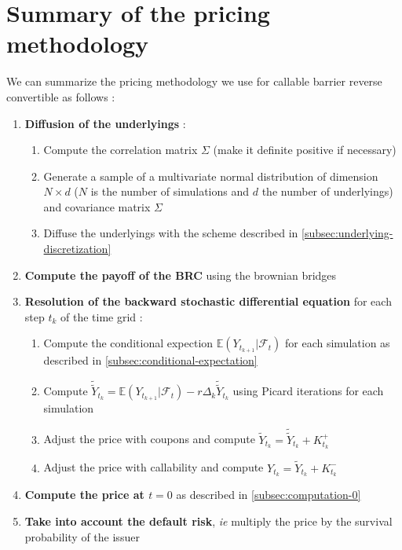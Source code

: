 \documentclass[a4paper,11pt,english]{book}
\begin{document}
\section{Summary of the pricing methodology}
\label{sec:summary}
We can summarize the pricing methodology we use for callable barrier reverse convertible as follows :
\begin{enumerate}
    \item \textbf{Diffusion of the underlyings} :
    \begin{enumerate}
        \item Compute the correlation matrix $\Sigma$ (make it definite positive if necessary)
        \item Generate a sample of a multivariate normal distribution of dimension $N\times d$ ($N$ is the number of simulations and $d$ the number of underlyings) and covariance matrix  $\Sigma$ 
        \item Diffuse the underlyings with the scheme described in \ref{subsec:underlying-discretization}
    \end{enumerate}
    \item \textbf{Compute the payoff of the BRC} using the brownian bridges
    \item \textbf{Resolution of the backward stochastic differential equation} for each step $t_{k}$ of the time grid :
    \begin{enumerate}
        \item Compute the conditional expection $\mathbb{E}(Y_{t_{k+1}}|\mathcal{F}_{t})$ for each simulation as described in \ref{subsec:conditional-expectation}
        \item Compute $\widetilde{\widetilde{Y}}_{t_{k}}=\mathbb{E}(Y_{t_{k+1}}|\mathcal{F}_{t}) -r\Delta_{k}\widetilde{\widetilde{Y}}_{t_{k}}$ using Picard iterations for each simulation
        \item Adjust the price with coupons and compute $\widetilde{Y}_{t_{k}} = \widetilde{\widetilde{Y}}_{t_{k}} + K_{t_{k}}^{+}$
        \item Adjust the price with callability and compute $Y_{t_{k}} = \widetilde{Y}_{t_{k}} + K_{t_{k}}^{-}$
    \end{enumerate}
    \item \textbf{Compute the price at $t=0$} as described in \ref{subsec:computation-0}
    \item \textbf{Take into account the default risk}, \textit{ie} multiply the price by the survival probability of the issuer
\end{enumerate}
\end{document}
